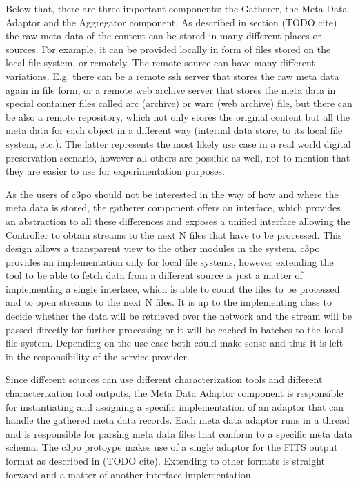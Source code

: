 Below that, there are three important components: the Gatherer, the Meta Data Adaptor and the Aggregator component.
As described in section (TODO cite) the raw meta data of the content can be stored in many different places or sources. For example, it can be provided locally in form of files stored on the local file system, or remotely. The remote source can have many different variations. E.g. there can be a remote ssh server that stores the raw meta data again in file form, or a remote web archive server that stores the meta data in special container files called arc (archive) or warc (web archive) file, but there can be also a remote repository, which not only stores the original content but all the meta data for each object in a different way (internal data store, to its local file system, etc.). The latter represents the most likely use case in a real world digital preservation scenario, however all others are possible as well, not to mention that they are easier to use for experimentation purposes.

As the users of c3po should not be interested in the way of how and where the meta data is stored, the gatherer component offers an interface, which provides an abstraction to all these differences and exposes a unified interface allowing the Controller to obtain streams to the next N files that have to be processed. This design allows a transparent view to the other modules in the system. c3po provides an implementation only for local file systems, however extending the tool to be able to fetch data from a different source is just a matter of implementing a single interface, which is able to count the files to be processed and to open streams to the next N files. It is up to the implementing class to decide whether the data will be retrieved over the network and the stream will be passed directly for further processing or it will be cached in batches to the local file system. Depending on the use case both could make sense and thus it is left in the responsibility of the service provider.

Since different sources can use different characterization tools and different characterization tool outputs, the Meta Data Adaptor component is responsible for instantiating and assigning a specific implementation of an adaptor that can handle the gathered meta data records. Each meta data adaptor runs in a thread and is responsible for parsing meta data files that conform to a specific meta data schema. The c3po protoype makes use of a single adaptor for the FITS output format as described in (TODO cite). Extending to other formats is straight forward and a matter of another interface implementation.

